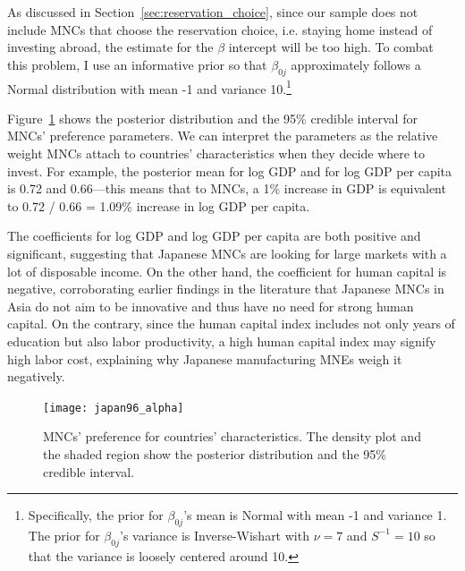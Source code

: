 As discussed in Section~\ref{sec:reservation_choice}, since our sample does not
include MNCs that choose the reservation choice, i.e. staying home instead of
investing abroad, the estimate for the $\beta$ intercept will be too high. To
combat this problem, I use an informative prior so that $\beta_{0j}$
approximately follows a Normal distribution with mean -1 and variance
10.\footnote{Specifically, the prior for $\beta_{0j}$'s mean is Normal with mean
  -1 and variance 1. The prior for $\beta_{0j}$'s variance is Inverse-Wishart
  with $\nu = 7$ and $S^{-1} = 10$ so that the variance is loosely centered
  around 10.}

Figure~\ref{fig:japan96_alpha} shows the posterior distribution and the 95\%
credible interval for MNCs' preference parameters. We can interpret the
parameters as the relative weight MNCs attach to countries' characteristics when
they decide where to invest. For example, the posterior mean for log GDP and for
log GDP per capita is 0.72 and 0.66---this means that to MNCs, a 1\% increase in
GDP is equivalent to 0.72 / 0.66 = 1.09\% increase in log GDP per capita.

The coefficients for log GDP and log GDP per capita are both positive and
significant, suggesting that Japanese MNCs are looking for large markets with a
lot of disposable income. On the other hand, the coefficient for human capital
is negative, corroborating earlier findings in the literature that Japanese MNCs
in Asia do not aim to be innovative and thus have no need for strong human
capital. On the contrary, since the human capital index includes not only years
of education but also labor productivity, a high human capital index may signify
high labor cost, explaining why Japanese manufacturing MNEs weigh it negatively.

\begin{figure}[tbp] \centering
  \texttt{[image: japan96\_alpha]}
  \caption[MNCs' preference for countries' characteristics.]{MNCs' preference
    for countries' characteristics. The density plot and the shaded region show
    the posterior distribution and the 95\% credible interval.}
  \label{fig:japan96_alpha}
\end{figure}

